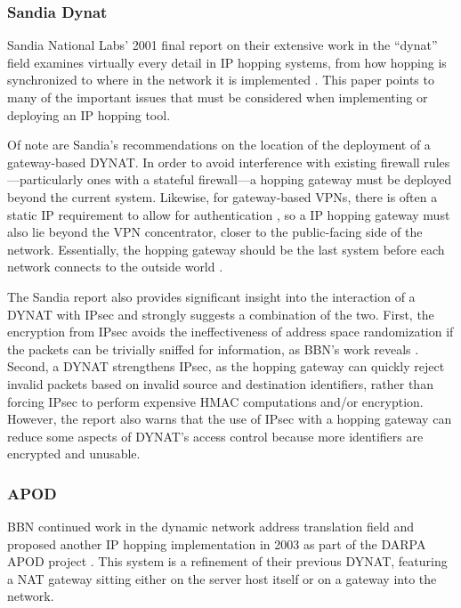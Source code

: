 \subsubsection{Sandia Dynat}
\par Sandia National Labs' 2001 final report on their extensive work in the ``dynat'' field examines virtually every detail in \ac{IP} hopping systems, from how hopping is synchronized to where in the network it is implemented \cite{SandiaDynat}. This paper points to many of the important issues that must be considered when implementing or deploying an \ac{IP} hopping tool.

\par Of note are Sandia's recommendations on the location of the deployment of a gateway-based \ac{DYNAT}. In order to avoid interference with existing firewall rules---particularly ones with a stateful firewall---a hopping gateway must be deployed beyond the current system. Likewise, for gateway-based \acp{VPN}, there is often a static \ac{IP} requirement to allow for authentication \cite{SandiaDynat}, so a IP hopping gateway must also lie beyond the \ac{VPN} concentrator, closer to the public-facing side of the network. Essentially, the hopping gateway should be the last system before each network connects to the outside world \cite{SandiaDynat}.

\par The Sandia report also provides significant insight into the interaction of a \ac{DYNAT} with \ac{IPsec} and strongly suggests a combination of the two. First, the encryption from \ac{IPsec} avoids the ineffectiveness of address space randomization if the packets can be trivially sniffed for information, as BBN's work reveals \cite{BBNDYNAT}. Second, a \ac{DYNAT} strengthens \ac{IPsec}, as the hopping gateway can quickly reject invalid packets based on invalid source and destination identifiers, rather than forcing IPsec to perform expensive \ac{HMAC} computations and/or encryption. However, the report also warns that the use of IPsec with a hopping gateway can reduce some aspects of \ac{DYNAT}'s access control because more identifiers are encrypted and unusable.

\subsubsection{\acf{APOD}}
\par BBN continued work in the dynamic network address translation field and proposed another IP hopping implementation in 2003 as part of the \ac{DARPA} \acf{APOD} project \cite{APOD}. This system is a refinement of their previous \ac{DYNAT}, featuring a \ac{NAT} gateway sitting either on the server host itself or on a gateway into the network.

